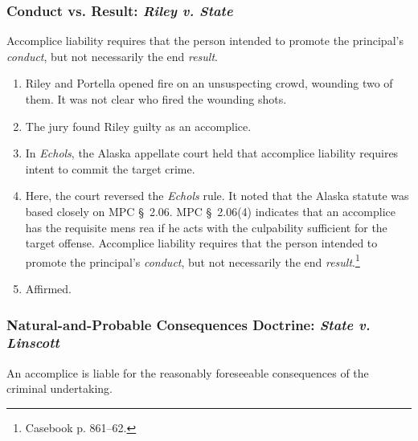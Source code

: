 \subsubsection{Conduct vs. Result: \emph{Riley v. State}}

Accomplice liability requires that the person intended to promote the 
principal's \emph{conduct}, but not necessarily the end \emph{result}.

\begin{enumerate}
    \item Riley and Portella opened fire on an unsuspecting crowd, wounding 
    two of them. It was not clear who fired the wounding shots.
    \item The jury found Riley guilty as an accomplice.
    \item In \emph{Echols}, the Alaska appellate court held that accomplice 
    liability requires intent to commit the target crime.
    \item Here, the court reversed the \emph{Echols} rule. It noted that the 
    Alaska statute was based closely on MPC \S\ 2.06. MPC \S\ 2.06(4) 
    indicates that an accomplice has the requisite mens rea if he acts with 
    the culpability sufficient for the target offense. Accomplice liability 
    requires that the person intended to promote the principal's 
    \emph{conduct}, but not necessarily the end 
    \emph{result}.\footnote{Casebook p. 861--62.}
    \item Affirmed.
\end{enumerate}

\subsubsection{Natural-and-Probable Consequences Doctrine: \emph{State v. 
Linscott}}

An accomplice is liable for the reasonably foreseeable consequences of the 
criminal undertaking.

